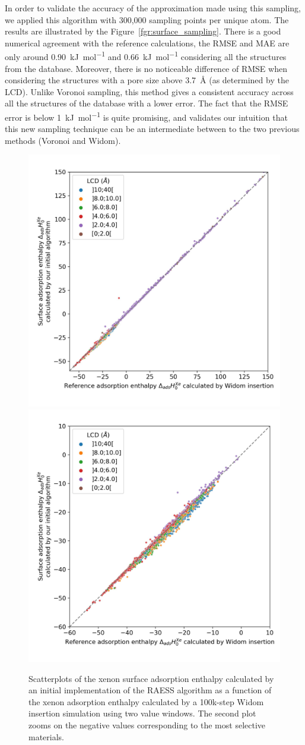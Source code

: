 \documentclass[main]{subfiles}
\begin{document}
In order to validate the accuracy of the approximation made using this sampling, we applied this algorithm with 300,000 sampling points per unique atom. The results are illustrated by the Figure~\ref{fgr:surface_sampling}. There is a good numerical agreement with the reference calculations, {the RMSE and MAE are only around \SI{0.90}{\kilo\joule\per\mole} and \SI{0.66}{\kilo\joule\per\mole}} considering all the structures from the database. Moreover, there is no noticeable difference of RMSE when considering the structures with a pore size above \SI{3.7}{\angstrom} (as determined by the LCD). Unlike Voronoi sampling, this method gives a consistent accuracy across all the structures of the database with a lower error. The fact that the {RMSE} error is below \SI{1}{\kilo\joule\per\mole} is quite promising, and validates our intuition that this new sampling technique can be an intermediate between to the two previous methods (Voronoi and Widom).

\begin{figure}[ht]
  \centering
  \includegraphics[width=0.45\linewidth]{figures/3-fastsim/H_Xe_widom_vs_H_Xe_surface_spiral_overview.jpg}
  \includegraphics[width=0.45\linewidth]{figures/3-fastsim/H_Xe_widom_vs_H_Xe_surface_spiral_zoom.jpg}
    \caption{Scatterplots of the xenon surface adsorption enthalpy calculated by an initial implementation of the RAESS algorithm as a function of the xenon adsorption enthalpy calculated by a 100k-step Widom insertion simulation using two value windows. The second plot zooms on the negative values corresponding to the most selective materials.}\label{fgr:surface_sampling_init}
\end{figure}
\end{document}
